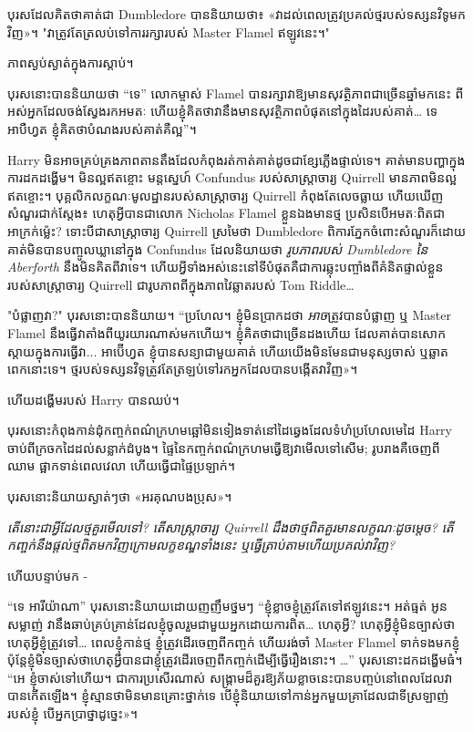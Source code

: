 {{បុរស​ដែល​គិត​ថា​គាត់​ជា Dumbledore បាន​និយាយ​ថា៖ «វា​ដល់​ពេល​ត្រូវ​ប្រគល់​ថ្ម​របស់​ទស្សនវិទូ​មក​វិញ»។ "វាត្រូវតែត្រលប់ទៅការរក្សារបស់ Master Flamel ឥឡូវនេះ។"

ភាពស្ងប់ស្ងាត់ក្នុងការស្តាប់។

បុរសនោះបាននិយាយថា “ទេ” លោកម្ចាស់ Flamel បានរក្សាវាឱ្យមានសុវត្ថិភាពជាច្រើនឆ្នាំមកនេះ ពីអស់អ្នកដែលចង់ស្វែងរកអមតៈ ហើយខ្ញុំគិតថាវានឹងមានសុវត្ថិភាពបំផុតនៅក្នុងដៃរបស់គាត់… ទេ អាបឺហ្វត ខ្ញុំគិតថាបំណងរបស់គាត់គឺល្អ”។

Harry មិនអាចគ្រប់គ្រងភាពតានតឹងដែលកំពុងរត់កាត់គាត់ដូចជាខ្សែភ្លើងផ្ទាល់ទេ។ គាត់មានបញ្ហាក្នុងការដកដង្ហើម។ មិនល្អឥតខ្ចោះ មន្តស្នេហ៍ Confundus របស់សាស្រ្តាចារ្យ Quirrell មានភាពមិនល្អឥតខ្ចោះ។ បុគ្គលិកលក្ខណៈមូលដ្ឋានរបស់សាស្រ្តាចារ្យ Quirrell កំពុងតែលេចធ្លាយ ហើយឃើញសំណួរជាក់ស្តែង៖ ហេតុអ្វីបានជាលោក Nicholas Flamel ខ្លួនឯងមានថ្ម ប្រសិនបើអមតៈពិតជាអាក្រក់ម្ល៉េះ? ទោះបីជាសាស្រ្តាចារ្យ Quirrell ស្រមៃថា Dumbledore ពិការភ្នែកចំពោះសំណួរក៏ដោយ គាត់មិនបានបញ្ចូលឃ្លានៅក្នុង Confundus ដែលនិយាយថា \emph{រូបភាពរបស់ Dumbledore នៃ Aberforth} នឹងមិនគិតពីវាទេ។ ហើយ​អ្វី​ទាំង​អស់​នេះ​នៅ​ទី​បំផុត​គឺ​ជា​ការ​ឆ្លុះ​បញ្ចាំង​ពី​គំនិត​ផ្ទាល់​ខ្លួន​របស់​សាស្ត្រាចារ្យ Quirrell ជា​រូបភាព​ពី​ក្នុង​ភាព​វៃឆ្លាត​របស់ Tom Riddle…

"បំផ្លាញវា?" បុរសនោះបាននិយាយ។ “ប្រហែល។ ខ្ញុំមិនប្រាកដថា \emph{អាច}ត្រូវបានបំផ្លាញ ឬ Master Flamel នឹងធ្វើវាតាំងពីយូរយារណាស់មកហើយ។ ខ្ញុំគិតថាជាច្រើនដងហើយ ដែលគាត់បានសោកស្តាយក្នុងការធ្វើវា... អាប៊ើហ្វត ខ្ញុំបានសន្យាជាមួយគាត់ ហើយយើងមិនមែនជាមនុស្សចាស់ ឬឆ្លាតពេកនោះទេ។ ថ្មរបស់ទស្សនវិទូត្រូវតែត្រឡប់ទៅរកអ្នកដែលបានបង្កើតវាវិញ»។

ហើយដង្ហើមរបស់ Harry បានឈប់។

បុរស​នោះ​កំពុង​កាន់​ដុំ​កញ្ចក់​ពណ៌​ក្រហម​ឆ្អៅ​មិន​ទៀងទាត់​នៅ​ដៃ​ឆ្វេង​ដែល​ទំហំ​ប្រហែល​មេដៃ Harry ចាប់​ពី​ក្រចកដៃ​ដល់​សន្លាក់​ដំបូង។ ផ្ទៃនៃកញ្ចក់ពណ៌ក្រហមធ្វើឱ្យវាមើលទៅសើម; រូបរាង​គឺ​ចេញ​ពី​ឈាម ផ្អាក​ទាន់​ពេល​វេលា ហើយ​ធ្វើ​ជា​ផ្ទៃ​ប្រឡាក់។

បុរស​នោះ​និយាយ​ស្ងាត់ៗ​ថា «​អរគុណ​បង​ប្រុស​»។

\emph{តើនោះជាអ្វីដែលថ្មគួរមើលទៅ? តើសាស្រ្តាចារ្យ Quirrell ដឹងថាថ្មពិតគួរមានលក្ខណៈដូចម្តេច? តើកញ្ចក់នឹងផ្តល់ថ្មពិតមកវិញក្រោមលក្ខខណ្ឌទាំងនេះ ឬធ្វើត្រាប់តាមហើយប្រគល់វាវិញ?}

ហើយបន្ទាប់មក -

“ទេ អារីយ៉ាណា” បុរសនោះនិយាយដោយញញឹមថ្នមៗ “ខ្ញុំខ្លាចខ្ញុំត្រូវតែទៅឥឡូវនេះ។ អត់ធ្មត់ អូនសម្លាញ់ វានឹងឆាប់គ្រប់គ្រាន់ដែលខ្ញុំចូលរួមជាមួយអ្នកដោយការពិត… ហេតុអ្វី? ហេតុអ្វីខ្ញុំមិនច្បាស់ថាហេតុអ្វីខ្ញុំត្រូវទៅ… ពេលខ្ញុំកាន់ថ្ម ខ្ញុំត្រូវដើរចេញពីកញ្ចក់ ហើយរង់ចាំ Master Flamel ទាក់ទងមកខ្ញុំ ប៉ុន្តែខ្ញុំមិនច្បាស់ថាហេតុអ្វីបានជាខ្ញុំត្រូវដើរចេញពីកញ្ចក់ដើម្បីធ្វើរឿងនោះ។ …” បុរសនោះដកដង្ហើមធំ។ “អេ ខ្ញុំ​ចាស់​ទៅ​ហើយ។ ជាការប្រសើរណាស់ សង្រ្គាមដ៏គួរឱ្យភ័យខ្លាចនេះបានបញ្ចប់នៅពេលដែលវាបានកើតឡើង។ ខ្ញុំ​ស្មាន​ថា​មិន​មាន​គ្រោះ​ថ្នាក់​ទេ បើ​ខ្ញុំ​និយាយ​ទៅ​កាន់​អ្នក​មួយ​គ្រា​ដែល​ជា​ទី​ស្រឡាញ់​របស់​ខ្ញុំ បើ​អ្នក​ប្រាថ្នា​ដូច្នេះ»។

}}
